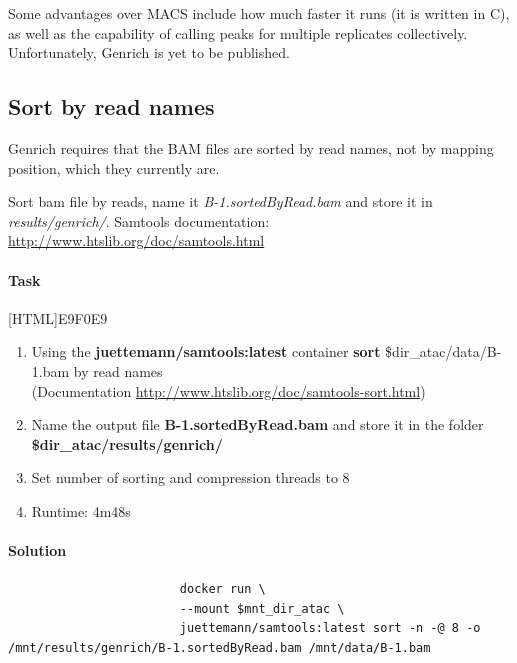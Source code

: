 \documentclass[12pt]{article}
\begin{document}
		Some advantages over MACS include how much faster it runs (it is written in C), as well as the capability of calling peaks for multiple replicates collectively. 
		Unfortunately, Genrich is yet to be published.
		
		\subsection{Sort by read names}
			Genrich requires that the BAM files are sorted by read names, not by mapping position, which they currently are.
			
			Sort bam file by reads, name it \textit{B-1.sortedByRead.bam} and store it in \textit{results/genrich/}. Samtools documentation: \url{http://www.htslib.org/doc/samtools.html}	
			
			\paragraph{Task}
			
				[HTML]{E9F0E9}{\parbox{\linewidth}{%
						\begin{enumerate}
							\item Using the \textbf{ juettemann/samtools:latest} container \textbf{sort} \$dir\_atac/data/B-1.bam by read names\\
							(Documentation \url{http://www.htslib.org/doc/samtools-sort.html})
							\item Name the output file \textbf{B-1.sortedByRead.bam} and store it in the folder \textbf{\$dir\_atac/results/genrich/} 
							\item Set number of sorting and compression threads to 8
							\item Runtime: 4m48s
						\end{enumerate}
				}}
			
			\paragraph{Solution}
				
				\begin{minipage}{\linewidth}
					\begin{lstlisting}
						docker run \
						--mount $mnt_dir_atac \
						juettemann/samtools:latest sort -n -@ 8 -o /mnt/results/genrich/B-1.sortedByRead.bam /mnt/data/B-1.bam	
					\end{lstlisting}
				\end{minipage}
		
\end{document}
